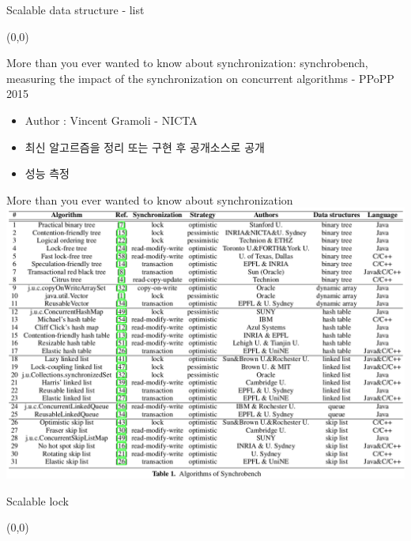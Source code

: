 \documentclass[english]{beamer} %
\begin{document}
\begin{frame}{Scalable data structure - list}
\begin{textblock}{1}(0,0)
\end{textblock}
\end{frame}


\begin{frame}{More than you ever wanted to know about synchronization: synchrobench, measuring
the impact of the synchronization on concurrent algorithms - PPoPP 2015}
    \begin{itemize}
    \item Author : Vincent Gramoli - NICTA 
    \item 최신 알고르즘을 정리 또는 구현 후 공개소스로 공개
    \item 성능 측정
    \end{itemize}
\end{frame}

\begin{frame}{More than you ever wanted to know about synchronization}
\includegraphics[width=\textwidth,height=0.8\textheight,
keepaspectratio]{algorithm}
\end{frame}


\begin{frame}{Scalable lock}
\begin{textblock}{1}(0,0)
\end{textblock}
\end{frame}
\end{document}
